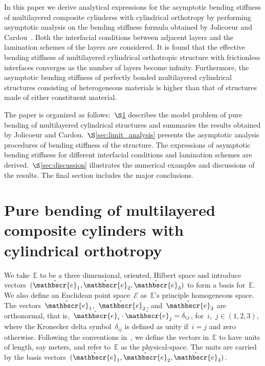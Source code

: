 \documentclass[preprint,10pt,times]{elsarticle}
\numberwithin{equation}{section}
\newcommand{\physe}{\hat{\mathbscr{e}}} %
\renewcommand{\>}{$\Rightarrow$}
\begin{document}
In this paper we derive analytical expressions for the asymptotic bending stiffness of multilayered composite cylinderss with cylindrical orthotropy by performing asymptotic analysis on the bending stiffness formula obtained by Jolicoeur and Cardou~\cite{Jolicoeur1994}.
%
Both the interfacial conditions between adjacent layers and the lamination schemes of the layers are considered.
%
It is found that the effective bending stiffness of multilayered cylindrical orthotropic structure with frictionless interfaces converges as the number of layers become infinity. %
Furthermore, the asymptotic bending stiffness of perfectly bonded multilayered cylindrical structures consisting of heterogeneous materials is higher than that of structures made of either constituent material.


The paper is organized as follows:~$\S$\ref{sec:bending_model} describes the model problem of pure bending of multilayered cylindrical structures and summaries the results obtained by Jolicoeur and Cardou.~$\S$\ref{sec:limit_analysis} presents the asymptotic analysis procedures of bending stiffness of the structure. The expressions of asymptotic bending stiffness for different interfacial conditions and lamination schemes are derived.~$\S$\ref{sec:discussion} illustrates the numerical examples and discussions of the results. The final section includes the major conclusions.



\section{Pure bending of multilayered composite cylinders with cylindrical orthotropy}
\label{sec:bending_model}

We take~$\mathbb{E}$ to be a three dimensional, oriented, Hilbert space and introduce vectors~$(\physe_1,\physe_2,\physe_3)$ to form a basis for~$\mathbb{E}$. We also define an Euclidean point space~$\mathcal{E}$ as~$\mathbb{E}$'s principle homogeneous space.
The vectors~$\physe_1$,~$\physe_2$, and~$\physe_3$ are orthonormal, that is,~$\physe_i\cdot\physe_j=\delta_{ij}$, for~$i$,~$j\in (1,2,3)$, where the Kronecker delta symbol~$\delta_{ij}$ is defined as unity if~$i=j$ and zero otherwise.
Following the conventions in~\cite{rahaman2020accelerometer,deng2021angle}, we define the vectors in~$\mathbb{E}$ to have units of length, say meters, and refer to~$\mathbb{E}$ as the physical-space. The units are carried by the basis vectors~$(\physe_1,\physe_2,\physe_3)$.
\end{document}
